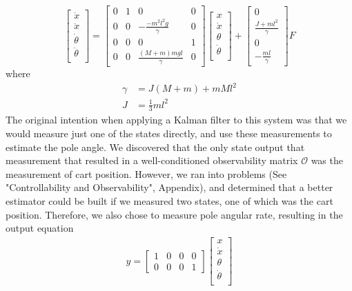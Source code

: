 \documentclass{article}
\begin{document}
\begin{equation}
\begin{bmatrix}
	\dot{x} \\
	\ddot{x} \\
	\dot{\theta} \\
	\ddot{\theta} \\
\end{bmatrix} = \begin{bmatrix}
0 & 1 & 0 & 0 \\
0 & 0 & -\frac{-m^2l^2g}{\gamma} & 0 \\
0 & 0 & 0 & 1\\
0 & 0 & \frac{(M+m)mgl}{\gamma} & 0
\end{bmatrix} \begin{bmatrix}
	x \\
	\dot{x} \\
	\theta \\
	\dot{\theta} \\
\end{bmatrix}  + \begin{bmatrix}
0 \\
\frac{J+ml^2}{\gamma} \\
0 \\
-\frac{ml}{\gamma}
\end{bmatrix} F
\label{eq:ss_continuous}
\end{equation}
where 
\begin{align*}
\gamma &= J(M+m)+mMl^2 \\
J &= \frac{1}{3}ml^2
\end{align*}
The original intention when applying a Kalman filter to this system was that we would measure just one of the states directly, and use these measurements to estimate the pole angle. We discovered that the only state output that measurement that resulted in a well-conditioned observability matrix $\mathcal{O}$ was the measurement of cart position. However, we ran into problems (See "Controllability and Observability", Appendix), and determined that a better estimator could be built if we measured two states, one of which was the cart position. Therefore, we also chose to measure pole angular rate, resulting in the output equation
\begin{align}
y = \begin{bmatrix}
1 & 0 & 0 & 0 \\
0 & 0 & 0 & 1
\end{bmatrix} \begin{bmatrix}
	x \\
	\dot{x} \\
	\theta \\
	\dot{\theta} \\
\end{bmatrix}
\label{eq:1output}
\end{align}
\end{document}
